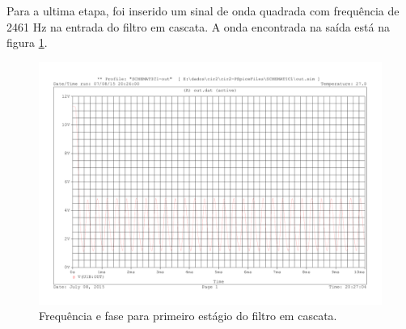 Para a ultima etapa, foi inserido um sinal de onda quadrada com frequência de 2461 Hz na entrada do filtro em cascata. A onda encontrada na saída está na figura \ref{f_square}.

\begin{figure}[H]
\centering
\includegraphics[scale=0.5]{Imagens/square.pdf}
\caption{Frequência e fase para primeiro estágio do filtro em cascata.}
\label{f_square}
\end{figure}
